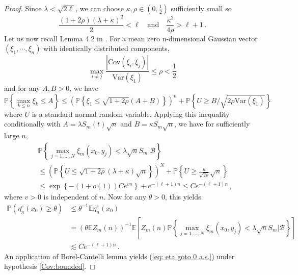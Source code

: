 \documentclass[12pt,reqno]{amsart}
\theoremstyle{remark}
\newcommand{\1}{\mathbf{1}}
\def\EE{\mathbb{E}}
\def\PP{\mathbb{P}}
\def\lt{\left}
\def\rt{\right}
\begin{document}
\begin{proof}
			Since $\lambda < \sqrt{2\ell}$, we can choose $\kappa, \rho \in(0,\frac12)$ sufficiently small so 
			\begin{equation}
			\frac{(1+2\rho)(\lambda+\kappa)^2}{2} < \ell \quad \text{and} \quad \frac{\kappa^2}{4\rho} > \ell+1\,.
			\end{equation}
			Let us now recall Lemma 4.2 in \cite{MR3178468}. For a mean zero n-dimensional Gaussian vector $(\xi_1, \cdots, \xi_n)$ with identically distributed components, 
			\begin{equation}
			\max_{i \neq j} \frac{|\text{Cov} (\xi_i, \xi_j)|}{ \text{Var}(\xi_1)} \leq \rho< \frac{1}{2}
			\end{equation}
			and for any $A,B >0$, we have
			\begin{equation}
			\PP \left\{ \max_{k \leq n} \xi_k \leq A \right\} \leq \left( \PP \left\{ \xi_1 \leq \sqrt{1+2\rho} (A+B)\right\}\right)^n + \PP \left \{ U \geq B/\sqrt{2\rho \text{Var} (\xi_1)} \right\}
			\end{equation}
			where $U$ is a standard normal random variable. Applying this inequality conditionally with $A=\lambda S_m(t) \sqrt{n}$ and $B= \kappa S_m \sqrt{n}$, we have for sufficiently large $n$,
			\begin{align*}
			&\PP \left\{ \max_{j=1,\dots,N} \xi_m(x_0,y_j) < \lambda \sqrt{n} S_m \Big| \mathcal{B}   \right\}\\
			&\leq \left(\PP \left\{ U \leq \sqrt{1+2\rho} (\lambda+\kappa) \sqrt{n}\right\} \right)^{N} + \PP \left\{ U \geq \frac\kappa{\sqrt{2\rho}} \sqrt{n} \right\}\\
			&\leq \exp \left\{ - (1+o(1)) C e^{vn} \right\} + e^{-(\ell+1)n} \leq C e^{-(\ell+1)n}\,,
			\end{align*}
			where $v>0$ is independent of $n$. Now for any $\theta>0$, this yields
			\begin{align*}
				\PP(\eta_n^c(x_0)\ge \theta)&\le \theta^{-1}\EE \eta_n^c(x_0) 	
				\\&=(\theta\EE Z_m(n))^{-1}\EE\lt[Z_m(n)\PP\left\{ \max_{j=1,\dots,N} \xi_m(x_0,y_j) < \lambda \sqrt{n} S_m \Big| \mathcal{B}   \right\}\rt]
				\\&\lesssim Ce^{-(\ell+1)n}\,.
			\end{align*} 
			An application of Borel-Cantelli lemma yields (\ref{eq: eta goto 0 a.s.}) under hypothesis \ref{Cov:bounded}.


\end{proof}
\end{document}
